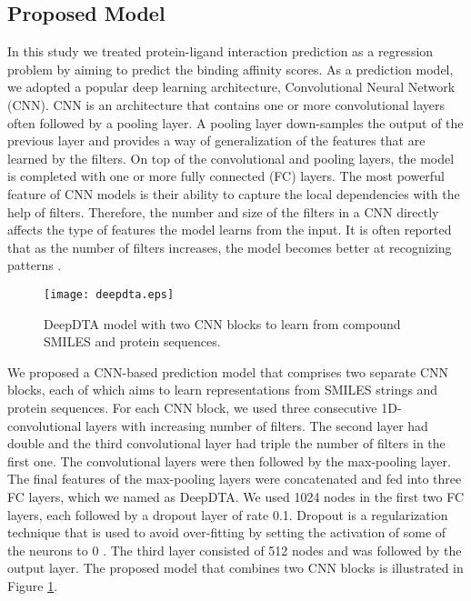 \documentclass[11pt,letterpaper]{article}
\begin{document}
\subsection*{Proposed Model }
\label{s:proposed}
In this study we treated protein-ligand interaction prediction as a regression problem by aiming to predict the binding affinity scores.  As a prediction model, we  adopted a  popular  deep learning architecture, Convolutional Neural Network (CNN).  CNN is an architecture that contains one or more convolutional layers often followed by a pooling layer. A pooling layer down-samples the output of the previous layer and provides a way of generalization of the features that are learned by the filters.  On  top of the convolutional and pooling layers, the model is completed with one or more fully connected  (FC) layers. The most powerful feature of  CNN models is their ability to capture the local dependencies with the help of filters. Therefore, the number and size of the filters in a CNN directly affects the type of features the model learns from the input. It is often reported that as the number of filters increases, the model becomes better at recognizing patterns \cite{kang2014convolutional}.

\begin{figure}[H]\centerline{\texttt{[image: deepdta.eps]}}
\caption{DeepDTA model with two CNN blocks to learn from compound SMILES and protein sequences.}\label{fig:03}
\end{figure}

We proposed a CNN-based prediction model  that comprises two separate CNN blocks, each of which aims to learn representations from SMILES strings and protein sequences. For each CNN block, we used three consecutive 1D-convolutional layers with increasing number of filters. The second layer had double and the third convolutional layer had triple the number of filters in the first one. The convolutional layers were then followed by the max-pooling layer. The final features of the max-pooling layers were concatenated and fed into three FC layers, which we named as DeepDTA. We used 1024 nodes in the first two FC layers, each followed by a dropout layer of rate 0.1. Dropout  is  a regularization technique that is used to avoid over-fitting by setting the activation of some of the neurons to 0  \cite{srivastava2014dropout}.  The third layer consisted of 512 nodes and was followed by the output layer. The proposed model that combines two CNN blocks is illustrated in Figure \ref{fig:03}. 
\end{document}
